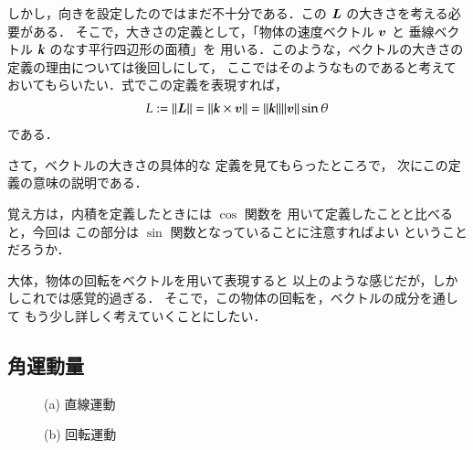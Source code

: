             しかし，向きを設定したのではまだ不十分である．この $\boldsymbol{L}$ の大きさを考える必要がある．
            そこで，大きさの定義として，「物体の速度ベクトル $\boldsymbol{v}$ と
            垂線ベクトル $\textbf{\textit{k}}$ のなす平行四辺形の面積」を
            用いる．このような，ベクトルの大きさの定義の理由については後回しにして，
            ここではそのようなものであると考えておいてもらいたい．式でこの定義を表現すれば，
            \begin{align}
                L:=\|\boldsymbol{L}\|=\|\textbf{\textit{k}} \times \boldsymbol{v}\|
                =\| \textbf{\textit{k}} \| \| \boldsymbol{v} \| \sin\theta
            \end{align}
            である．

            さて，ベクトルの大きさの具体的な
            定義を見てもらったところで，
            次にこの定義の意味の説明である．

            覚え方は，内積を定義したときには $\cos$ 関数を
            用いて定義したことと比べると，今回は
            この部分は $\sin$ 関数となっていることに注意すればよい
            ということだろうか．

            大体，物体の回転をベクトルを用いて表現すると
            以上のような感じだが，しかしこれでは感覚的過ぎる．
            そこで，この物体の回転を，ベクトルの成分を通して
            もう少し詳しく考えていくことにしたい．

        \subsection{角運動量}
                \begin{figure}[hbt]
                    \begin{center}
                        \label{fig:kaku_unndouryou2}
                        \caption{(a) 直線運動}
                    \end{center}
                \end{figure}
                \begin{figure}[hbt]
                    \begin{center}
                        \label{fig:kaku_unndouryou1}
                        \caption{(b) 回転運動}
                    \end{center}
                \end{figure}


